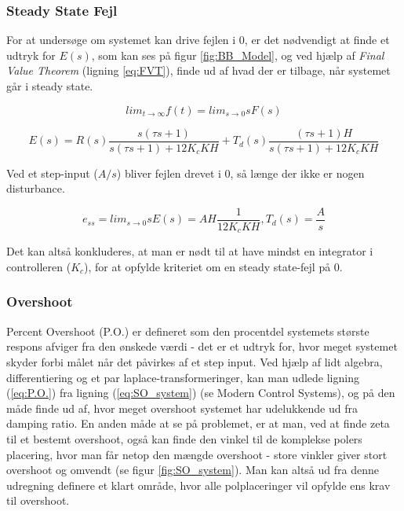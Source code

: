 \subsubsection{Steady State Fejl}

For at undersøge om systemet kan drive fejlen i 0, er det nødvendigt at finde et udtryk for $E(s)$, som kan ses på figur \ref{fig:BB_Model}, og ved hjælp af \textit{Final Value Theorem} (ligning \ref{eq:FVT}), finde ud af hvad der er tilbage, når systemet går i steady state. 

\begin{equation} \label{eq:FVT}
lim_{t \to \infty} f(t) = lim_{s \to 0} sF(s)
\end{equation}

\begin{equation} \label{eq:ess}
E(s)=R(s)\frac{s(\tau s+1)}{s(\tau s+1)+12K_{c}KH}+T_{d}(s)\frac{(\tau s+1)H}{s(\tau s+1)+12K_{c}KH}
\end{equation}

Ved et step-input ($A/s$) bliver fejlen drevet i 0, så længe der ikke er nogen disturbance. 

\begin{equation}
e_{ss}=lim_{s \to 0} sE(s)=AH\frac{1}{12K_{c}KH} , T_{d}(s)=\dfrac{A}{s}
\end{equation}

Det kan altså konkluderes, at man er nødt til at have mindst en integrator i controlleren ($K_{c}$), for at opfylde kriteriet om en steady state-fejl på 0. 

\subsubsection{Overshoot}

Percent Overshoot (P.O.) er defineret som den procentdel systemets største respons afviger fra den ønskede værdi - det er et udtryk for, hvor meget systemet skyder forbi målet når det påvirkes af et step input. Ved hjælp af lidt algebra, differentiering og et par laplace-transformeringer, kan man udlede ligning (\ref{eq:P.O.}) fra ligning (\ref{eq:SO_system}) (se Modern Control Systems\cite{ModernControlSystem}), og på den måde finde ud af, hvor meget overshoot systemet har udelukkende ud fra damping ratio. En anden måde at se på problemet, er at man, ved at finde zeta til et bestemt overshoot, også kan finde den vinkel til de komplekse polers placering, hvor man får netop den mængde overshoot - store vinkler giver stort overshoot og omvendt (se figur \ref{fig:SO_system}). Man kan altså ud fra denne udregning definere et klart område, hvor alle polplaceringer vil opfylde ens krav til overshoot. 

